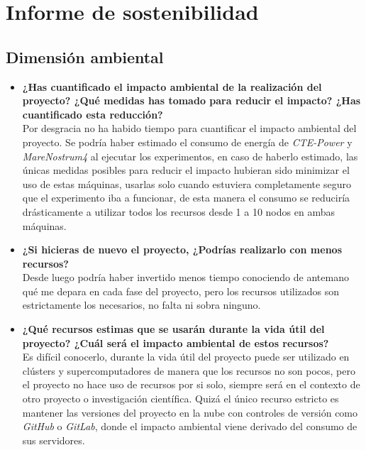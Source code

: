 \section{Informe de sostenibilidad}

\subsection{Dimensión ambiental}

\begin{itemize}
	\item \textbf{¿Has cuantificado el impacto ambiental de la realización del proyecto? ¿Qué medidas has
		tomado para reducir el impacto? ¿Has cuantificado esta reducción?} \\
	
	Por desgracia no ha habido tiempo para cuantificar el impacto ambiental del proyecto. Se podría haber estimado el consumo de energía de \textit{CTE-Power} y \textit{MareNostrum4} al ejecutar los experimentos, en caso de haberlo estimado, las únicas medidas posibles para reducir el impacto hubieran sido minimizar el uso de estas máquinas, usarlas solo cuando estuviera completamente seguro que el experimento iba a funcionar, de esta manera el consumo se reduciría drásticamente a utilizar todos los recursos desde 1 a 10 nodos en ambas máquinas. 
	
	\item \textbf{¿Si hicieras de nuevo el proyecto, ¿Podrías realizarlo con menos recursos?} \\
	
	Desde luego podría haber invertido menos tiempo conociendo de antemano qué me depara en cada fase del proyecto, pero los recursos utilizados son estrictamente los necesarios, no falta ni sobra ninguno.
	
	\item \textbf{¿Qué recursos estimas que se usarán durante la vida útil del proyecto? ¿Cuál será el
		impacto ambiental de estos recursos?} \\
	
	Es difícil conocerlo, durante la vida útil del proyecto puede ser utilizado en clústers y supercomputadores de manera que los recursos no son pocos, pero el proyecto no hace uso de recursos por si solo, siempre será en el contexto de otro proyecto o investigación científica. Quizá el único recurso estricto es mantener las versiones del proyecto en la nube con controles de versión como \textit{GitHub} o \textit{GitLab}, donde el impacto ambiental viene derivado del consumo de sus servidores.
	

\end{itemize}
